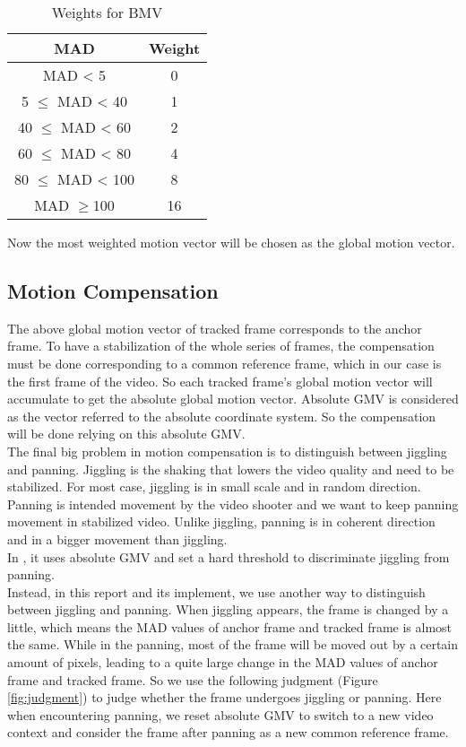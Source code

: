 \documentclass[a4paper, twocolumn]{article}
\begin{document}
	\begin{table}[h]
		\caption{Weights for BMV}
		\label{tb:weight}
		\centering
		\begin{tabular}{|c | c|}
			\hline
			\textbf{MAD} & \textbf{Weight} \\ 
			\hline
			MAD < 5 & 0 \\ 
			\hline
			5 $\leq$ MAD < 40 & 1 \\ 
			\hline
			40 $\leq$ MAD < 60 & 2 \\ 
			\hline
			60 $\leq$ MAD < 80 & 4 \\ 
			\hline
			80 $\leq$ MAD < 100 & 8 \\ 
			\hline
			MAD $\geq$100 & 16 \\
			\hline
		\end{tabular}
	\end{table} 	
	
	\noindent
	Now the most weighted motion vector will be chosen as the global motion vector.
	
	\subsection{Motion Compensation}
	The above global motion vector of tracked frame corresponds to the anchor frame. To have a stabilization of the whole series of frames, the compensation must be done corresponding to a common reference frame, which in our case is the first frame of the video. So each tracked frame's global motion vector will accumulate to get the absolute global motion vector. Absolute GMV is considered as the vector referred to the absolute coordinate system. So the compensation will be done relying on this absolute GMV. \\
	The final big problem in motion compensation is to distinguish between jiggling and panning. Jiggling is the shaking that lowers the video quality and need to be stabilized.
	For most case, jiggling is in small scale and in random direction. Panning is intended movement by the video shooter and we want to keep panning movement in stabilized video. Unlike jiggling, panning is in coherent direction and in a bigger movement than jiggling. \\
	In \cite{abmvf}, it uses absolute GMV and set a hard threshold to discriminate jiggling from panning.\\
	Instead, in this report and its implement, we use another way to distinguish between jiggling and panning. When jiggling appears, the frame is changed by a little, which means the MAD values of anchor frame and tracked frame is almost the same. While in the panning, most of the frame will be moved out by a certain amount of pixels, leading to a quite large change in the MAD values of anchor frame and tracked frame. So we use the following judgment (Figure \ref{fig:judgment}) to judge whether the frame undergoes jiggling or panning. Here when encountering panning, we reset absolute GMV to switch to a new video context and consider the frame after panning as a new common reference frame.
	 
\end{document}
